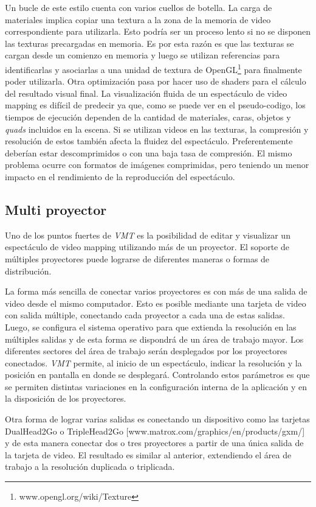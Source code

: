 Un bucle de este estilo cuenta con varios cuellos de botella.
La carga de materiales implica copiar una textura a la zona de la memoria de video correspondiente para utilizarla. Esto podría ser un proceso lento si no se disponen las texturas precargadas en memoria. Es por esta razón es que las texturas se cargan desde un comienzo en memoria y luego se utilizan referencias para identificarlas y asociarlas a una unidad de textura de OpenGL\footnote{www.opengl.org/wiki/Texture} para finalmente poder utilizarla.
Otra optimización pasa por hacer uso de shaders para el cálculo del resultado visual final.
La visualización fluida de un espectáculo de video mapping es difícil de predecir ya que, como se puede ver en el pseudo-codigo, los tiempos de ejecución dependen de la cantidad de materiales, caras, objetos y \emph{quads} incluidos en la escena.
Si se utilizan videos en las texturas, la compresión y resolución de estos también afecta la fluidez del espectáculo. Preferentemente deberían estar descomprimidos o con una baja tasa de compresión. El mismo problema ocurre con formatos de imágenes comprimidas, pero teniendo un menor impacto en el rendimiento de la reproducción del espectáculo.

\subsection{Multi proyector}

Uno de los puntos fuertes de \emph{VMT} es la posibilidad de editar y visualizar un espectáculo de video mapping utilizando más de un proyector. El soporte de múltiples proyectores puede lograrse de diferentes maneras o formas de distribución.

La forma más sencilla de conectar varios proyectores es con más de una salida de video desde el mismo computador. Esto es posible mediante una tarjeta de video con salida múltiple, conectando cada proyector a cada una de estas salidas. Luego, se configura el sistema operativo para que extienda la resolución en las múltiples salidas y de esta forma se dispondrá de un área de trabajo mayor. Los diferentes sectores del área de trabajo serán desplegados por los proyectores conectados.
\emph{VMT} permite, al inicio de un espectáculo, indicar la resolución y la posición en pantalla en donde se desplegará. Controlando estos parámetros es que se permiten distintas variaciones en la configuración interna de la aplicación y en la disposición de los proyectores.

Otra forma de lograr varias salidas es conectando un dispositivo como las tarjetas DualHead2Go o TripleHead2Go [www.matrox.com/graphics/en/products/gxm/] y de esta manera conectar dos o tres proyectores a partir de una única salida de la tarjeta de video. El resultado es similar al anterior, extendiendo el área de trabajo a la resolución duplicada o triplicada.

